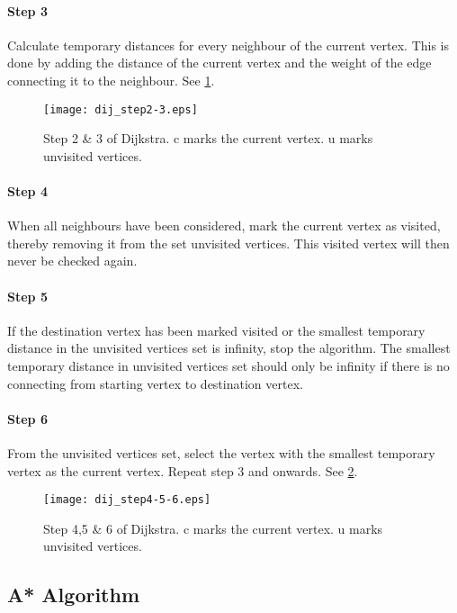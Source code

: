     \paragraph{Step 3}
Calculate temporary distances for every neighbour of the current vertex. This is done by adding the distance of the current vertex and the weight of the edge connecting it to the neighbour. See \cref{fig:dij_step2-3}.

  \begin{figure}[ht!]
    \centering
    \texttt{[image: dij\_step2-3.eps]}
    \caption{Step 2 \& 3 of Dijkstra. c marks the current vertex. u marks unvisited vertices.}
    \label{fig:dij_step2-3}
  \end{figure}

      \paragraph{Step 4}
When all neighbours have been considered, mark the current vertex as visited, thereby removing it from the set unvisited vertices. This visited vertex will then never be checked again. 

\paragraph{Step 5}
If the destination vertex has been marked visited or the smallest temporary distance in the unvisited vertices set is infinity, stop the algorithm. The smallest temporary distance in unvisited vertices set should only be infinity if there is no connecting from starting vertex to destination vertex.

\paragraph{Step 6}
From the unvisited vertices set, select the vertex with the smallest temporary vertex as the current vertex. Repeat step 3 and onwards. See \cref{fig:dij_step4-5-6}.

  \begin{figure}[ht!]
    \centering
    \texttt{[image: dij\_step4-5-6.eps]}
    \caption{Step 4,5 \& 6 of Dijkstra. c marks the current vertex. u marks unvisited vertices.}
    \label{fig:dij_step4-5-6}
  \end{figure}


  \subsection{A* Algorithm}\label{subs_astar}



